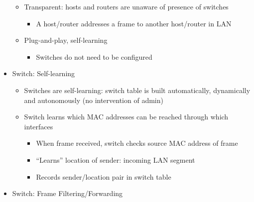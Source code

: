 \begin{itemize}
\begin{itemize}
      \item Transparent: hosts and routers are unaware of presence of switches

        \begin{itemize}

          \item A host/router addresses a frame to another host/router in LAN

        \end{itemize}

      \item Plug-and-play, self-learning

        \begin{itemize}

          \item Switches do not need to be configured

        \end{itemize}

    \end{itemize}

  \item Switch: Self-learning

    \begin{itemize}

      \item Switches are self-learning: switch table is built automatically, dynamically and autonomously (no intervention of admin)

      \item Switch learns which MAC addresses can be reached through which interfaces

        \begin{itemize}

          \item When frame received, switch checks source MAC address of frame

          \item “Learns” location of sender: incoming LAN segment

          \item Records sender/location pair in switch table

        \end{itemize}

    \end{itemize}

  \item Switch: Frame Filtering/Forwarding

    \begin{itemize}


\end{itemize}
\end{itemize}

